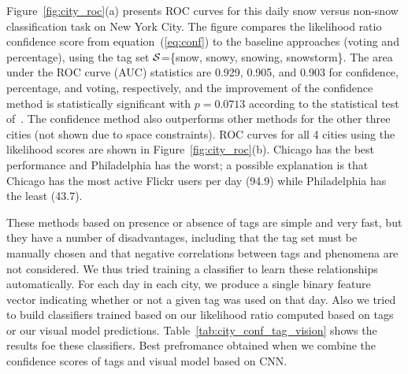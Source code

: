 Figure~\ref{fig:city_roc}(a) presents ROC curves for this
daily snow versus non-snow classification task on New York City. The figure compares the likelihood
ratio confidence score from equation~(\ref{eq:conf}) to the baseline
approaches (voting and percentage), using the tag set
${\cal S}$=\{snow, snowy, snowing, snowstorm\}.
The area under the ROC curve (AUC) statistics are 0.929, 0.905, and 0.903 for confidence, percentage, and voting, respectively, 
and the improvement of the confidence method is statistically significant 
with $p=0.0713$ according to the statistical test of~\cite{auc}.
The confidence method also outperforms other methods for the other three cities (not shown due to
space constraints).  ROC curves for all 4 cities using the likelihood
scores are shown in Figure~\ref{fig:city_roc}(b). Chicago has the best
performance and Philadelphia has the worst; a possible explanation
is that Chicago has the most active Flickr users per
day (94.9) while Philadelphia has the least (43.7).

These methods based on presence or absence of tags are simple and very
fast, but they have a number of disadvantages, including that the tag
set must be manually chosen and that negative correlations between
tags and phenomena are not considered.
We thus tried training a classifier to learn these relationships automatically.
For each day in each city, we produce a single binary feature vector indicating whether 
or not a given tag was used on that day. Also we tried to build classifiers trained based on our likelihood ratio computed based on tags or our visual model predictions. Table~\ref{tab:city_conf_tag_vision} shows the results foe these classifiers. Best prefromance obtained when we combine the confidence scores of tags and visual model based on CNN.
%


